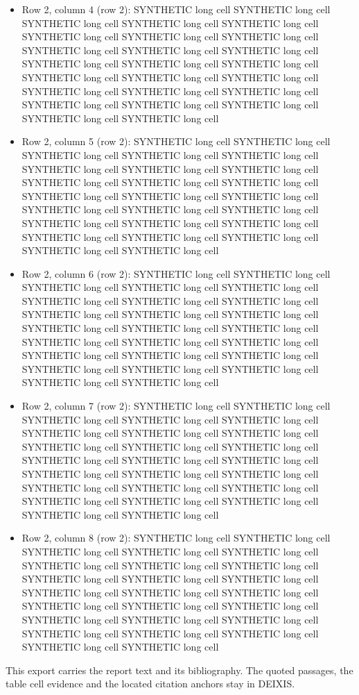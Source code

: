 \documentclass[journal]{IEEEtran}
\begin{document}
\begin{itemize}
\item[15.] Row 2, column 4 (row 2): SYNTHETIC long cell SYNTHETIC long cell SYNTHETIC long cell SYNTHETIC long cell SYNTHETIC long cell SYNTHETIC long cell SYNTHETIC long cell SYNTHETIC long cell SYNTHETIC long cell SYNTHETIC long cell SYNTHETIC long cell SYNTHETIC long cell SYNTHETIC long cell SYNTHETIC long cell SYNTHETIC long cell SYNTHETIC long cell SYNTHETIC long cell SYNTHETIC long cell SYNTHETIC long cell SYNTHETIC long cell SYNTHETIC long cell SYNTHETIC long cell SYNTHETIC long cell SYNTHETIC long cell SYNTHETIC long cell
\item[16.] Row 2, column 5 (row 2): SYNTHETIC long cell SYNTHETIC long cell SYNTHETIC long cell SYNTHETIC long cell SYNTHETIC long cell SYNTHETIC long cell SYNTHETIC long cell SYNTHETIC long cell SYNTHETIC long cell SYNTHETIC long cell SYNTHETIC long cell SYNTHETIC long cell SYNTHETIC long cell SYNTHETIC long cell SYNTHETIC long cell SYNTHETIC long cell SYNTHETIC long cell SYNTHETIC long cell SYNTHETIC long cell SYNTHETIC long cell SYNTHETIC long cell SYNTHETIC long cell SYNTHETIC long cell SYNTHETIC long cell SYNTHETIC long cell
\item[17.] Row 2, column 6 (row 2): SYNTHETIC long cell SYNTHETIC long cell SYNTHETIC long cell SYNTHETIC long cell SYNTHETIC long cell SYNTHETIC long cell SYNTHETIC long cell SYNTHETIC long cell SYNTHETIC long cell SYNTHETIC long cell SYNTHETIC long cell SYNTHETIC long cell SYNTHETIC long cell SYNTHETIC long cell SYNTHETIC long cell SYNTHETIC long cell SYNTHETIC long cell SYNTHETIC long cell SYNTHETIC long cell SYNTHETIC long cell SYNTHETIC long cell SYNTHETIC long cell SYNTHETIC long cell SYNTHETIC long cell SYNTHETIC long cell
\item[18.] Row 2, column 7 (row 2): SYNTHETIC long cell SYNTHETIC long cell SYNTHETIC long cell SYNTHETIC long cell SYNTHETIC long cell SYNTHETIC long cell SYNTHETIC long cell SYNTHETIC long cell SYNTHETIC long cell SYNTHETIC long cell SYNTHETIC long cell SYNTHETIC long cell SYNTHETIC long cell SYNTHETIC long cell SYNTHETIC long cell SYNTHETIC long cell SYNTHETIC long cell SYNTHETIC long cell SYNTHETIC long cell SYNTHETIC long cell SYNTHETIC long cell SYNTHETIC long cell SYNTHETIC long cell SYNTHETIC long cell SYNTHETIC long cell
\item[19.] Row 2, column 8 (row 2): SYNTHETIC long cell SYNTHETIC long cell SYNTHETIC long cell SYNTHETIC long cell SYNTHETIC long cell SYNTHETIC long cell SYNTHETIC long cell SYNTHETIC long cell SYNTHETIC long cell SYNTHETIC long cell SYNTHETIC long cell SYNTHETIC long cell SYNTHETIC long cell SYNTHETIC long cell SYNTHETIC long cell SYNTHETIC long cell SYNTHETIC long cell SYNTHETIC long cell SYNTHETIC long cell SYNTHETIC long cell SYNTHETIC long cell SYNTHETIC long cell SYNTHETIC long cell SYNTHETIC long cell SYNTHETIC long cell
\end{itemize}

This export carries the report text and its bibliography. The quoted passages, the table cell evidence and the located citation anchors stay in DEIXIS.




\end{document}
